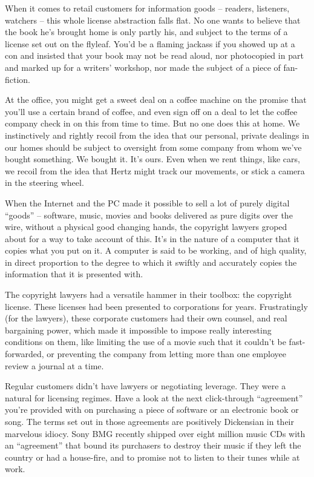 When it comes to retail customers for information goods -- readers,
listeners, watchers -- this whole license abstraction falls flat.
No one wants to believe that the book he's brought home is only
partly his, and subject to the terms of a license set out on the
flyleaf. You'd be a flaming jackass if you showed up at a con and
insisted that your book may not be read aloud, nor photocopied in
part and marked up for a writers' workshop, nor made the subject of
a piece of fan-fiction.

At the office, you might get a sweet deal on a coffee machine on
the promise that you'll use a certain brand of coffee, and even
sign off on a deal to let the coffee company check in on this from
time to time. But no one does this at home. We instinctively and
rightly recoil from the idea that our personal, private dealings in
our homes should be subject to oversight from some company from
whom we've bought something. We bought it. It's ours. Even when we
rent things, like cars, we recoil from the idea that Hertz might
track our movements, or stick a camera in the steering wheel.

When the Internet and the PC made it possible to sell a lot of
purely digital ``goods'' -- software, music, movies and books
delivered as pure digits over the wire, without a physical good
changing hands, the copyright lawyers groped about for a way to
take account of this. It's in the nature of a computer that it
copies what you put on it. A computer is said to be working, and of
high quality, in direct proportion to the degree to which it
swiftly and accurately copies the information that it is presented
with.

The copyright lawyers had a versatile hammer in their toolbox: the
copyright license. These licenses had been presented to
corporations for years. Frustratingly (for the lawyers), these
corporate customers had their own counsel, and real bargaining
power, which made it impossible to impose really interesting
conditions on them, like limiting the use of a movie such that it
couldn't be fast-forwarded, or preventing the company from letting
more than one employee review a journal at a time.

Regular customers didn't have lawyers or negotiating leverage. They
were a natural for licensing regimes. Have a look at the next
click-through ``agreement'' you're provided with on purchasing a
piece of software or an electronic book or song. The terms set out
in those agreements are positively Dickensian in their marvelous
idiocy. Sony BMG recently shipped over eight million music CDs with
an ``agreement'' that bound its purchasers to destroy their music if
they left the country or had a house-fire, and to promise not to
listen to their tunes while at work.


